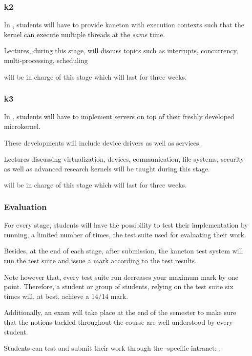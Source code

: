 
\begin{frame}
  \frametitle{k2}

  In , students will have to provide kaneton with execution contexts
  such that the kernel can execute multiple threads at the \textit{same} time.

  \-

  Lectures, during this stage, will discuss topics such as interrupts,
  concurrency, multi-processing, scheduling \etc{}

  \-

   will be in charge of this stage which will last for
  three weeks.
\end{frame}


\begin{frame}
  \frametitle{k3}

  In , students will have to implement servers on top of their freshly
  developed microkernel.

  \-

  These developments will include device drivers as well as services.

  \-

  Lectures discussing virtualization, devices, communication, file systems,
  security as well as advanced research kernels will be taught during this
  stage.

  \-

   will be in charge of this stage
  which will last for three weeks.
\end{frame}


\begin{frame}
  \frametitle{Evaluation}

  For every stage, students will have the possibility to test their
  implementation by running, a limited number of times, the test suite used
  for evaluating their work.

  \-

  Besides, at the end of each stage, after submission, the kaneton test system
  will run the test suite and issue a mark according to the test results.

  \-

  Note however that, every test suite run decreases your maximum mark by
  one point. Therefore, a student or group of students, relying on the test
  suite six times will, at best, achieve a 14/14 mark.

  \-

  Additionally, an exam will take place at the end of the semester to make
  sure that the notions tackled throughout the course are well understood
  by every student.

  \-

  Students can test and submit their work through the -specific
  intranet: .
\end{frame}

